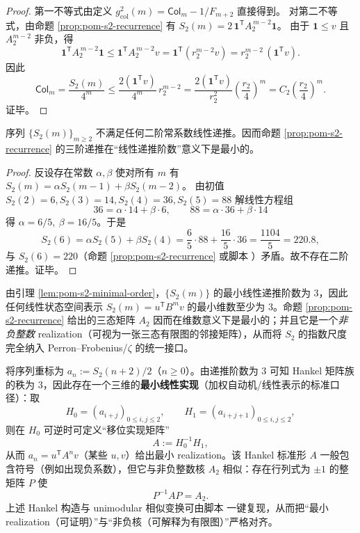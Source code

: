 \begin{proof}
第一不等式由定义 \(g_{\mathrm{col}}^2(m)=\mathsf{Col}_m-1/F_{m+2}\) 直接得到。
对第二不等式，由命题 \ref{prop:pom-s2-recurrence} 有
\(
S_2(m)=2\,\mathbf{1}^{\mathsf T}A_2^{\,m-2}\mathbf{1}
\)。
由于 \(\mathbf{1}\le v\) 且 \(A_2^{m-2}\) 非负，得
\[
\mathbf{1}^{\mathsf T}A_2^{\,m-2}\mathbf{1}\le \mathbf{1}^{\mathsf T}A_2^{\,m-2}v=\mathbf{1}^{\mathsf T}(r_2^{m-2}v)=r_2^{m-2}\,(\mathbf{1}^{\mathsf T}v).
\]
因此
\[
\mathsf{Col}_m=\frac{S_2(m)}{4^m}\le \frac{2(\mathbf{1}^{\mathsf T}v)}{4^m}\,r_2^{m-2}
=\frac{2(\mathbf{1}^{\mathsf T}v)}{r_2^2}\left(\frac{r_2}{4}\right)^m
=C_2\left(\frac{r_2}{4}\right)^m.
\]
证毕。
\end{proof}

\begin{lemma}[三阶递推的最小性]\label{lem:pom-s2-minimal-order}
序列 \(\{S_2(m)\}_{m\ge 2}\) 不满足任何二阶常系数线性递推。因而命题 \ref{prop:pom-s2-recurrence} 的三阶递推在“线性递推阶数”意义下是最小的。
\end{lemma}
\begin{proof}
反设存在常数 \(\alpha,\beta\) 使对所有 \(m\) 有 \(S_2(m)=\alpha S_2(m-1)+\beta S_2(m-2)\)。
由初值 \(S_2(2)=6,S_2(3)=14,S_2(4)=36,S_2(5)=88\) 解线性方程组
$$
36=\alpha\cdot 14+\beta\cdot 6,\qquad
88=\alpha\cdot 36+\beta\cdot 14
$$
得 \(\alpha=6/5,\ \beta=16/5\)。于是
$$
S_2(6)=\alpha S_2(5)+\beta S_2(4)=\frac65\cdot 88+\frac{16}{5}\cdot 36=\frac{1104}{5}=220.8,
$$
与 \(S_2(6)=220\)（命题 \ref{prop:pom-s2-recurrence} 或脚本 ）矛盾。故不存在二阶递推。证毕。
\end{proof}

\begin{remark}\label{rem:pom-s2-minimal-realization}
由引理 \ref{lem:pom-s2-minimal-order}，\(\{S_2(m)\}\) 的最小线性递推阶数为 \(3\)，因此任何线性状态空间表示 \(S_2(m)=u^{\mathsf T}B^{m}v\) 的最小维数至少为 \(3\)。命题 \ref{prop:pom-s2-recurrence} 给出的三态矩阵 \(A_2\) 因而在维数意义下是最小的；并且它是一个\emph{非负整数} realization（可视为一张三态有限图的邻接矩阵），从而将 \(S_2\) 的指数尺度完全纳入 Perron--Frobenius/\(\zeta\) 的统一接口。
\end{remark}

\begin{remark}\label{rem:pom-s2-hankel}
将序列重标为 \(a_n:=S_2(n+2)/2\)（\(n\ge 0\)）。由递推阶数为 \(3\) 可知 Hankel 矩阵族的秩为 \(3\)，因此存在一个三维的\textbf{最小线性实现}（加权自动机/线性表示的标准口径）：取
$$
H_0=(a_{i+j})_{0\le i,j\le 2},\qquad H_1=(a_{i+j+1})_{0\le i,j\le 2},
$$
则在 \(H_0\) 可逆时可定义“移位实现矩阵”
$$
A:=H_0^{-1}H_1,
$$
从而 \(a_n=u^{\mathsf T}A^{n}v\)（某些 \(u,v\)）给出最小 realization。该 Hankel 标准形 \(A\) 一般包含符号（例如出现负系数），但它与非负整数核 \(A_2\) 相似：存在行列式为 \(\pm 1\) 的整矩阵 \(P\) 使
$$
P^{-1}AP=A_2.
$$
上述 Hankel 构造与 unimodular 相似变换可由脚本  一键复现，从而把“最小 realization（可证明）”与“非负核（可解释为有限图）”严格对齐。
\end{remark}

